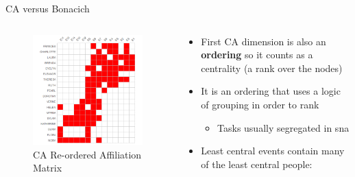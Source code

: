 \documentclass[
  ignorenonframetext,
]{beamer}
\providecommand{\tightlist}{%
  \setlength{\itemsep}{0pt}\setlength{\parskip}{0pt}}\usepackage{longtable,booktabs,array}
\begin{document}
\begin{frame}{CA versus Bonacich}
\protect\hypertarget{ca-versus-bonacich-9}{}
\begin{columns}[T]
\begin{column}{0.5\textwidth}
\begin{figure}

{\centering \includegraphics{Plots/ca-reord.png}

}

\caption{CA Re-ordered Affiliation Matrix}

\end{figure}
\end{column}

\begin{column}{0.5\textwidth}
\begin{itemize}
\tightlist
\item
  First CA dimension is also an \textbf{ordering} so it counts as a
  centrality (a rank over the nodes)
\item
  It is an ordering that uses a logic of grouping in order to rank

  \begin{itemize}
  \tightlist
  \item
    Tasks usually segregated in sna
  \end{itemize}
\item
  Least central events contain many of the least central people:


\end{itemize}
\end{column}
\end{columns}
\end{frame}
\end{document}
